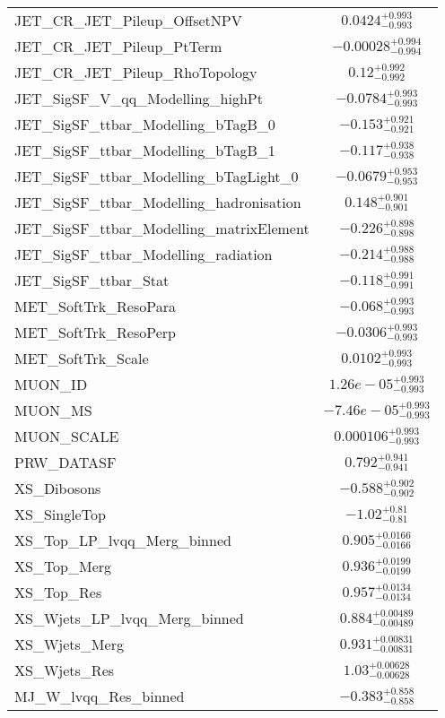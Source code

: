 \begin{tabular}{|l|c|}
JET\_CR\_JET\_Pileup\_OffsetNPV & $0.0424^{+0.993}_{-0.993}$ \\
JET\_CR\_JET\_Pileup\_PtTerm & $-0.00028^{+0.994}_{-0.994}$ \\
JET\_CR\_JET\_Pileup\_RhoTopology & $0.12^{+0.992}_{-0.992}$ \\
JET\_SigSF\_V\_qq\_Modelling\_highPt & $-0.0784^{+0.993}_{-0.993}$ \\
JET\_SigSF\_ttbar\_Modelling\_bTagB\_0 & $-0.153^{+0.921}_{-0.921}$ \\
JET\_SigSF\_ttbar\_Modelling\_bTagB\_1 & $-0.117^{+0.938}_{-0.938}$ \\
JET\_SigSF\_ttbar\_Modelling\_bTagLight\_0 & $-0.0679^{+0.953}_{-0.953}$ \\
JET\_SigSF\_ttbar\_Modelling\_hadronisation & $0.148^{+0.901}_{-0.901}$ \\
JET\_SigSF\_ttbar\_Modelling\_matrixElement & $-0.226^{+0.898}_{-0.898}$ \\
JET\_SigSF\_ttbar\_Modelling\_radiation & $-0.214^{+0.988}_{-0.988}$ \\
JET\_SigSF\_ttbar\_Stat & $-0.118^{+0.991}_{-0.991}$ \\
MET\_SoftTrk\_ResoPara & $-0.068^{+0.993}_{-0.993}$ \\
MET\_SoftTrk\_ResoPerp & $-0.0306^{+0.993}_{-0.993}$ \\
MET\_SoftTrk\_Scale & $0.0102^{+0.993}_{-0.993}$ \\
MUON\_ID & $1.26e-05^{+0.993}_{-0.993}$ \\
MUON\_MS & $-7.46e-05^{+0.993}_{-0.993}$ \\
MUON\_SCALE & $0.000106^{+0.993}_{-0.993}$ \\
PRW\_DATASF & $0.792^{+0.941}_{-0.941}$ \\
XS\_Dibosons & $-0.588^{+0.902}_{-0.902}$ \\
XS\_SingleTop & $-1.02^{+0.81}_{-0.81}$ \\
XS\_Top\_LP\_lvqq\_Merg\_binned & $0.905^{+0.0166}_{-0.0166}$ \\
XS\_Top\_Merg & $0.936^{+0.0199}_{-0.0199}$ \\
XS\_Top\_Res & $0.957^{+0.0134}_{-0.0134}$ \\
XS\_Wjets\_LP\_lvqq\_Merg\_binned & $0.884^{+0.00489}_{-0.00489}$ \\
XS\_Wjets\_Merg & $0.931^{+0.00831}_{-0.00831}$ \\
XS\_Wjets\_Res & $1.03^{+0.00628}_{-0.00628}$ \\
MJ\_W\_lvqq\_Res\_binned & $-0.383^{+0.858}_{-0.858}$ \\

\end{tabular}
